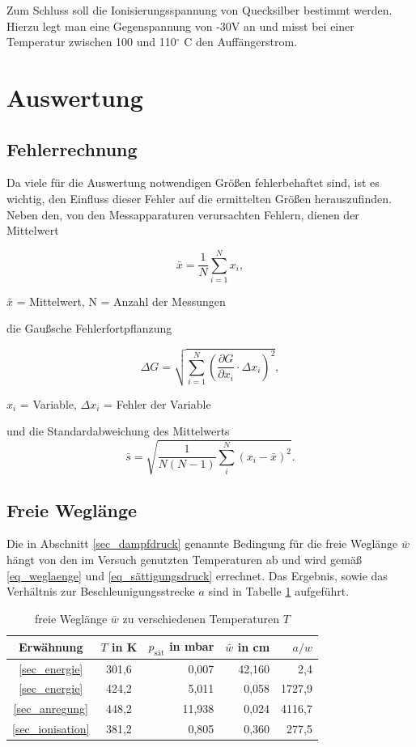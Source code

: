 Zum Schluss soll die Ionisierungsspannung von Quecksilber bestimmt werden. Hierzu legt man eine Gegenspannung von -30V an und misst bei einer Temperatur zwischen 100 und 110$^\circ$ C den Auffängerstrom.

\section{Auswertung}
\subsection{Fehlerrechnung}
Da viele für die Auswertung notwendigen Größen fehlerbehaftet sind, ist es wichtig, den Einfluss dieser Fehler auf die ermittelten
Größen herauszufinden. Neben den, von den Messapparaturen verursachten Fehlern, dienen der Mittelwert
\begin{formel}[H]
\begin{equation}
 \bar{x} = \frac1N \sum_{i=1}^{N} x_i,
 \label{eq_mittel}
\end{equation}
\caption*{\small{$\bar{x}$ = Mittelwert, N = Anzahl der Messungen}}
\end{formel}
die Gaußsche Fehlerfortpflanzung
\begin{formel}[H]
\begin{equation}
\Delta G = \sqrt{\sum_{i=1}^{N}\left( \frac{\partial G}{\partial x_i}\cdot \Delta x_i\right)^2},
\label{gauss}
\end{equation}
\caption*{$x_i$ = Variable, $\Delta x_i$ = Fehler der Variable}
\end{formel}
und die Standardabweichung des Mittelwerts
\begin{equation}
 \bar s = \sqrt{\frac{1}{N(N-1)} \sum_{i}^{N} (x_i - \bar{x})^2}.
 \label{eq_standard}
\end{equation}

\subsection{Freie Weglänge}
Die in Abschnitt \ref{sec_dampfdruck} genannte Bedingung für die freie Weglänge $\bar w$ hängt von den im Versuch genutzten Temperaturen
ab und wird gemäß \eqref{eq_weglaenge} und \eqref{eq_sättigungsdruck} errechnet. Das Ergebnis, sowie das Verhältnis zur Beschleunigungsstrecke $a$ sind in Tabelle 
\ref{tab_weglaenge} aufgeführt.

\begin{table}[H]
 \begin{tabular}{c|c|r|r|r}
  Erwähnung	&$T$ in K	&$p_{\text{sät}}$ in mbar&$\bar w$ in cm	&$a/w$ \\
  \hline
\ref{sec_energie}&	301,6	&0,007&	42,160&	2,4\\
\ref{sec_energie}&	424,2&	5,011	&0,058&	1727,9\\
\ref{sec_anregung}&	448,2&	11,938&	0,024&	4116,7\\
\ref{sec_ionisation}&	381,2&	0,805&	0,360&	277,5
 \end{tabular}
\caption{freie Weglänge $\bar w$ zu verschiedenen Temperaturen $T$}
\label{tab_weglaenge}
\end{table}

